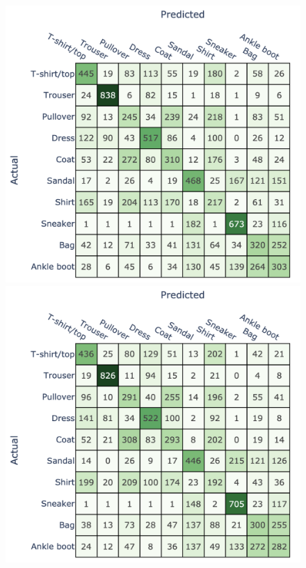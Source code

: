  \begin{figure}[!htb]
    \begin{minipage}{0.33\textwidth}
      \centering
      \includegraphics[width=1\linewidth]{images/CM_HybridPipeline_ProbabilisticMapping_SVC.png}
    \end{minipage}\hfill
    \begin{minipage}{0.33\textwidth}
      \centering
      \includegraphics[width=1\linewidth]{images/CM_HybridPipeline_ProbabilisticMapping_FCNN.png}

\end{minipage}
\end{figure}

